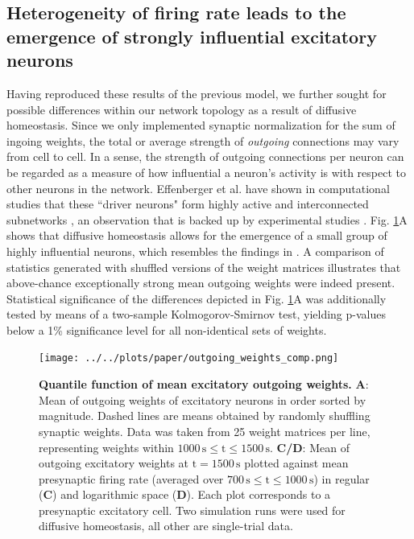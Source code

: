 \documentclass[10pt,letterpaper]{article}
\begin{document}
\subsection*{Heterogeneity of firing rate leads to the emergence of strongly influential excitatory neurons}\label{Section_Mean_outgoing_Weights}
Having reproduced these results of the previous model, we further sought for possible differences within our network topology as a result of diffusive homeostasis. Since we only implemented synaptic normalization for the sum of ingoing weights, the total or average strength of \emph{outgoing} connections may vary from cell to cell. In a sense, the strength of outgoing connections per neuron can be regarded as a measure of how influential a neuron's activity is with respect to other neurons in the network. Effenberger et al. have shown in computational studies that these ``driver neurons" form highly active and interconnected subnetworks \cite{Effenberger_2015}, an observation that is backed up by experimental studies \cite{Yassin_Subnetworks_2010,Eckmann_Leader_Neurons_2008}. Fig. \ref{Outgoing_Weights_Comp}A shows that diffusive homeostasis allows for the emergence of a small group of highly influential neurons, which resembles the findings in \cite{Effenberger_2015}. A comparison of statistics generated with shuffled versions of the weight matrices illustrates that above-chance exceptionally strong mean outgoing weights were indeed present. Statistical significance of the differences depicted in Fig. \ref{Outgoing_Weights_Comp}A was additionally tested by means of a two-sample Kolmogorov-Smirnov test, yielding p-values below a 1\% significance level for all non-identical sets of weights.

\begin{figure}
\texttt{[image: ../../plots/paper/outgoing\_weights\_comp.png]}
\caption{{\bf Quantile function of mean excitatory outgoing weights.} \textbf{A}: Mean of outgoing weights of excitatory neurons in order sorted by magnitude. Dashed lines are means obtained by randomly shuffling synaptic weights. Data was taken from 25 weight matrices per line, representing weights within $\mathrm{1000\,s \leq t \leq 1500\,s}$. \textbf{C/D}: Mean of outgoing excitatory weights at $\mathrm{t=1500\,s}$ plotted against mean presynaptic firing rate (averaged over $\mathrm{700\,s \leq t \leq 1000\,s}$) in regular (\textbf{C}) and logarithmic space (\textbf{D}). Each plot corresponds to a presynaptic excitatory cell. Two simulation runs were used for diffusive homeostasis, all other are single-trial data.}
\label{Outgoing_Weights_Comp}
\end{figure}
\end{document}
